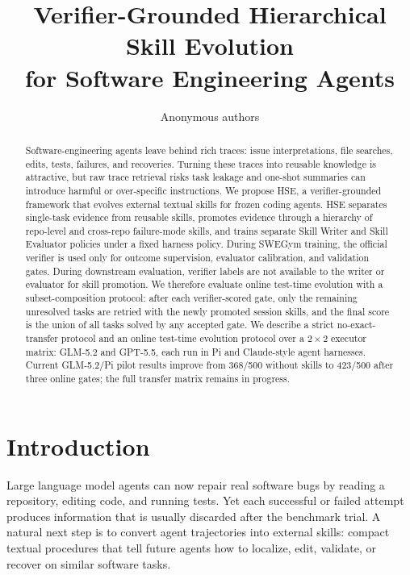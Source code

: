 \documentclass{article}
\title{Verifier-Grounded Hierarchical Skill Evolution\\for Software Engineering Agents}
\author{Anonymous authors}
\newcommand{\method}{HSE}
\begin{document}
\maketitle

\begin{abstract}
Software-engineering agents leave behind rich traces: issue interpretations, file
searches, edits, tests, failures, and recoveries. Turning these traces into
reusable knowledge is attractive, but raw trace retrieval risks task leakage and
one-shot summaries can introduce harmful or over-specific instructions. We
propose \method{}, a verifier-grounded framework that evolves external textual
skills for frozen coding agents. \method{} separates single-task evidence from
reusable skills, promotes evidence through a hierarchy of repo-level and
cross-repo failure-mode skills, and trains separate Skill Writer and Skill
Evaluator policies under a fixed harness policy. During SWEGym training, the
official verifier is used only for outcome supervision, evaluator calibration,
and validation gates. During downstream evaluation, verifier labels are not
available to the writer or evaluator for skill promotion. We therefore evaluate
online test-time evolution with a subset-composition protocol: after each
verifier-scored gate, only the remaining unresolved tasks are retried with the
newly promoted session skills, and the final score is the union of all tasks
solved by any accepted gate. We describe a strict no-exact-transfer protocol and
an online test-time evolution protocol over a $2{\times}2$ executor matrix:
GLM-5.2 and GPT-5.5, each run in Pi and Claude-style agent harnesses. Current
GLM-5.2/Pi pilot results improve from 368/500 without skills to 423/500 after
three online gates; the full transfer matrix remains in progress.
\end{abstract}

\section{Introduction}

Large language model agents can now repair real software bugs by reading a
repository, editing code, and running tests. Yet each successful or failed
attempt produces information that is usually discarded after the benchmark
trial. A natural next step is to convert agent trajectories into external
skills: compact textual procedures that tell future agents how to localize,
edit, validate, or recover on similar software tasks.
\end{document}
